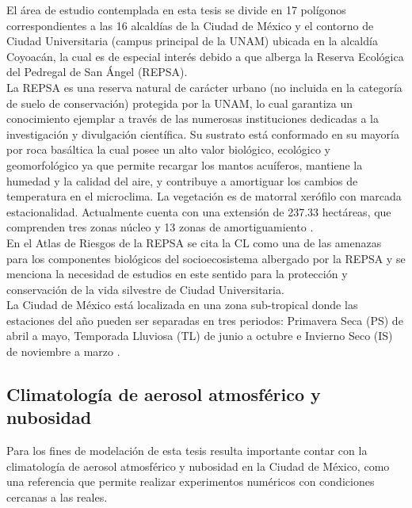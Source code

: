 \newpage

El área de estudio contemplada en esta tesis se divide en 17 polígonos correspondientes a las 16 alcaldías de la Ciudad de México y el contorno de Ciudad Universitaria (campus principal de la UNAM) ubicada en la alcaldía Coyoacán, la cual es de especial interés debido a que alberga la Reserva Ecológica del Pedregal de San Ángel (REPSA).\\

La REPSA es una reserva natural de carácter urbano (no incluida en la categoría de suelo de conservación) protegida por la UNAM, lo cual garantiza un conocimiento ejemplar a través de las numerosas instituciones dedicadas a la investigación y divulgación científica. Su sustrato está conformado en su mayoría por roca basáltica la cual posee un alto valor biológico, ecológico y geomorfológico ya que permite recargar los mantos acuíferos, mantiene la humedad y la calidad del aire, y contribuye a amortiguar los cambios de temperatura en el microclima. La vegetación es de matorral xerófilo con marcada estacionalidad. Actualmente cuenta con una extensión de 237.33 hectáreas, que comprenden tres zonas núcleo y 13 zonas de amortiguamiento \citep{REPSA2019}.\\

En el Atlas de Riesgos de la REPSA \citep{AtlasREPSA} se cita la CL como una de las amenazas para los componentes biológicos del socioecosistema albergado por la REPSA y se menciona la necesidad de estudios en este sentido para la protección y conservación de la vida silvestre de Ciudad Universitaria.\\

La Ciudad de México está localizada en una zona sub-tropical donde las estaciones del año pueden ser separadas en tres periodos: Primavera Seca (PS) de abril a mayo, Temporada Lluviosa (TL) de junio a octubre e Invierno Seco (IS) de noviembre a marzo \citep{Jauregui2002}.\\

\subsection{Climatología de aerosol atmosférico y nubosidad}
\label{subsec:climatologia}

Para los fines de modelación de esta tesis resulta importante contar con la climatología de aerosol atmosférico y nubosidad en la Ciudad de México, como una referencia que permite realizar experimentos numéricos con condiciones cercanas a las reales.\\

